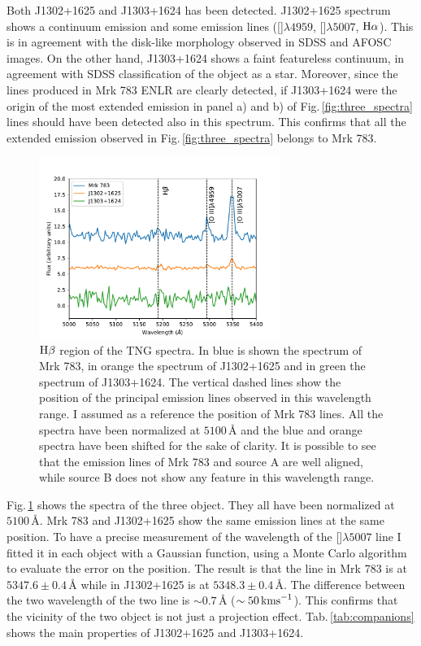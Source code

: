 \documentclass[../main.tex]{subfiles}
\begin{document}
Both J1302+1625 and J1303+1624 has been detected.
J1302+1625 spectrum shows a continuum emission and some emission lines ([]$\lambda4959$, []$\lambda5007$, $\Ha$).
This is in agreement with the disk-like morphology observed in SDSS and AFOSC images.
On the other hand, J1303+1624 shows a faint featureless continuum, in agreement with SDSS classification of the object as a star.
Moreover, since the lines produced in Mrk 783 ENLR are clearly detected, if J1303+1624 were the origin of the most extended emission in panel a) and b) of Fig.\,\ref{fig:three_spectra} lines should have been detected also in this spectrum.
This confirms that all the extended emission observed in Fig.\,\ref{fig:three_spectra} belongs to Mrk 783.

\begin{figure}
\centering
\includegraphics[width=0.7\textwidth]{images/paper3/companions_spec.pdf} 
\caption[]{$\Hb$ region of the TNG spectra. In blue is shown the spectrum of Mrk 783, in orange the spectrum of J1302+1625 and in green the spectrum of J1303+1624. The vertical dashed lines show the position of the principal emission lines observed in this wavelength range. I assumed as a reference the position of Mrk 783 lines. All the spectra have been normalized at $5100\,\si{\angstrom}$ and the blue and orange spectra have been shifted for the sake of clarity.
It is possible to see that the emission lines of Mrk 783 and source A are well aligned, while source B does not show any feature in this wavelength range.} 
\label{fig:companions_spec}
\end{figure} 

Fig.\,\ref{fig:companions_spec} shows the spectra of the three object.
They all have been normalized at $5100\,\si{\angstrom}$.
Mrk 783 and J1302+1625 show the same emission lines at the same position. 
To have a precise measurement of the wavelength of the []$\lambda5007$ line I fitted it in each object with a Gaussian function, using a Monte Carlo algorithm to evaluate the error on the position.
The result is that the line in Mrk 783  is at $5347.6\pm0.4\,\si{\angstrom}$ while in J1302+1625 is at $5348.3\pm0.4\,\si{\angstrom}$.
The difference between the two wavelength of the two line is $\sim 0.7\,\si{\angstrom}$ ($\sim 50\,\si{\kms}$).
This confirms that the vicinity of the two object is not just a projection effect.
Tab.\,\ref{tab:companions} shows the main properties of J1302+1625 and J1303+1624.
\end{document}
